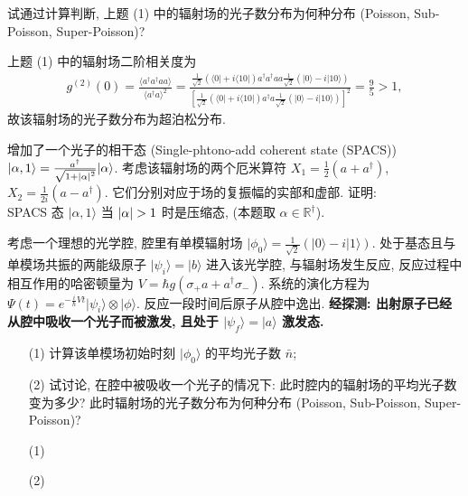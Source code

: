 \documentclass{assignment}
\begin{document}
\begin{prob}[20 分]
    试通过计算判断, 上题 (1) 中的辐射场的光子数分布为何种分布 (Poisson, Sub-Poisson, Super-Poisson)?
\end{prob}
\begin{sol}
    上题 (1) 中的辐射场二阶相关度为
    \begin{align}
        g^{(2)}(0)=\frac{\langle a^{\dagger}a^{\dagger}aa\rangle}{\langle a^{\dagger}a\rangle^2}=\frac{\frac{1}{\sqrt{2}}(\langle 0\rvert+i\langle 10\rvert)a^{\dagger}a^{\dagger}aa\frac{1}{\sqrt{2}}(\lvert 0\rangle-i\lvert 10\rangle)}{\left[\frac{1}{\sqrt{2}}(\langle 0\rvert+i\langle 10\rvert)a^{\dagger}a\frac{1}{\sqrt{2}}(\lvert 0\rangle-i\lvert 10\rangle)\right]^2}=\frac{9}{5}>1,
    \end{align}
    故该辐射场的光子数分布为超泊松分布.
\end{sol}

\begin{prob}[20 分]
    增加了一个光子的相干态 (Single-phtono-add coherent state (SPACS)) $\lvert\alpha,1\rangle=\frac{a^{\dagger}}{\sqrt{1+\left\lvert\alpha\right\rvert^2}}\lvert\alpha\rangle$. 考虑该辐射场的两个厄米算符 $X_1=\frac{1}{2}(a+a^{\dagger})$, $X_2=\frac{1}{2i}(a-a^{\dagger})$. 它们分别对应于场的复振幅的实部和虚部. 证明:\\
    SPACS 态 $\lvert\alpha,1\rangle$ 当 $\left\lvert\alpha\right\rvert>1$ 时是压缩态, (本题取 $\alpha\in\mathbb{R}^{\dagger}$).
\end{prob}
\begin{pf}
    
\end{pf}

\begin{prob}[20 分]
    考虑一个理想的光学腔, 腔里有单模辐射场 $\lvert\phi_0\rangle=\frac{1}{\sqrt{2}}(\lvert 0\rangle-i\lvert 1\rangle)$. 处于基态且与单模场共振的两能级原子 $\lvert\psi_i\rangle=\lvert b\rangle$ 进入该光学腔, 与辐射场发生反应, 反应过程中相互作用的哈密顿量为 $V=\hbar g(\sigma_+a+a^{\dagger}\sigma_-)$. 系统的演化方程为 $\Psi(t)=e^{-\frac{i}{\hbar}Vt}\lvert\psi_i\rangle\otimes\lvert\phi\rangle$. 反应一段时间后原子从腔中逸出. \textbf{经探测: 出射原子已经从腔中吸收一个光子而被激发, 且处于 $\lvert\psi_f\rangle=\lvert a\rangle$ 激发态.}
    \begin{itemize}
        \item[(1)] 计算该单模场初始时刻 $\lvert\phi_0\rangle$ 的平均光子数 $\bar{n}$;
        \item[(2)] 试讨论, 在腔中被吸收一个光子的情况下: 此时腔内的辐射场的平均光子数变为多少? 此时辐射场的光子数分布为何种分布 (Poisson, Sub-Poisson, Super-Poisson)?
    \end{itemize}
\end{prob}
\begin{sol}
    \begin{itemize}
        \item[(1)] 
        \item[(2)] 
    \end{itemize}
\end{sol}
\end{document}
